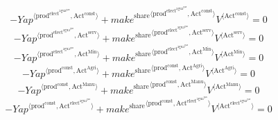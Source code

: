 \begin{equation}
-{{Y\!a\!p}}^{\langle \mathrm{prod}^{\mathrm{elect}^{\mathrm{agua}^{\mathrm{gas}}}},\mathrm{Act}^{\mathrm{const}}\rangle} + {{{m\!a\!k\!e}^{\mathrm{share}}}^{\langle \mathrm{\mathrm{prod}^{\mathrm{elect}^{\mathrm{agua}^{\mathrm{gas}}}}},\mathrm{\mathrm{Act}^{\mathrm{const}}}\rangle}} {{V}^{\langle \mathrm{Act}^{\mathrm{const}}\rangle}} = 0
\end{equation}
\begin{equation}
-{{Y\!a\!p}}^{\langle \mathrm{prod}^{\mathrm{elect}^{\mathrm{agua}^{\mathrm{gas}}}},\mathrm{Act}^{\mathrm{serv}}\rangle} + {{{m\!a\!k\!e}^{\mathrm{share}}}^{\langle \mathrm{\mathrm{prod}^{\mathrm{elect}^{\mathrm{agua}^{\mathrm{gas}}}}},\mathrm{\mathrm{Act}^{\mathrm{serv}}}\rangle}} {{V}^{\langle \mathrm{Act}^{\mathrm{serv}}\rangle}} = 0
\end{equation}
\begin{equation}
-{{Y\!a\!p}}^{\langle \mathrm{prod}^{\mathrm{elect}^{\mathrm{agua}^{\mathrm{gas}}}},\mathrm{Act}^{\mathrm{Min}}\rangle} + {{{m\!a\!k\!e}^{\mathrm{share}}}^{\langle \mathrm{\mathrm{prod}^{\mathrm{elect}^{\mathrm{agua}^{\mathrm{gas}}}}},\mathrm{\mathrm{Act}^{\mathrm{Min}}}\rangle}} {{V}^{\langle \mathrm{Act}^{\mathrm{Min}}\rangle}} = 0
\end{equation}
\begin{equation}
-{{Y\!a\!p}}^{\langle \mathrm{prod}^{\mathrm{const}},\mathrm{Act}^{\mathrm{Agri}}\rangle} + {{{m\!a\!k\!e}^{\mathrm{share}}}^{\langle \mathrm{\mathrm{prod}^{\mathrm{const}}},\mathrm{\mathrm{Act}^{\mathrm{Agri}}}\rangle}} {{V}^{\langle \mathrm{Act}^{\mathrm{Agri}}\rangle}} = 0
\end{equation}
\begin{equation}
-{{Y\!a\!p}}^{\langle \mathrm{prod}^{\mathrm{const}},\mathrm{Act}^{\mathrm{Manu}}\rangle} + {{{m\!a\!k\!e}^{\mathrm{share}}}^{\langle \mathrm{\mathrm{prod}^{\mathrm{const}}},\mathrm{\mathrm{Act}^{\mathrm{Manu}}}\rangle}} {{V}^{\langle \mathrm{Act}^{\mathrm{Manu}}\rangle}} = 0
\end{equation}
\begin{equation}
-{{Y\!a\!p}}^{\langle \mathrm{prod}^{\mathrm{const}},\mathrm{Act}^{\mathrm{elect}^{\mathrm{agua}^{\mathrm{gas}}}}\rangle} + {{{m\!a\!k\!e}^{\mathrm{share}}}^{\langle \mathrm{\mathrm{prod}^{\mathrm{const}}},\mathrm{\mathrm{Act}^{\mathrm{elect}^{\mathrm{agua}^{\mathrm{gas}}}}}\rangle}} {{V}^{\langle \mathrm{Act}^{\mathrm{elect}^{\mathrm{agua}^{\mathrm{gas}}}}\rangle}} = 0
\end{equation}
